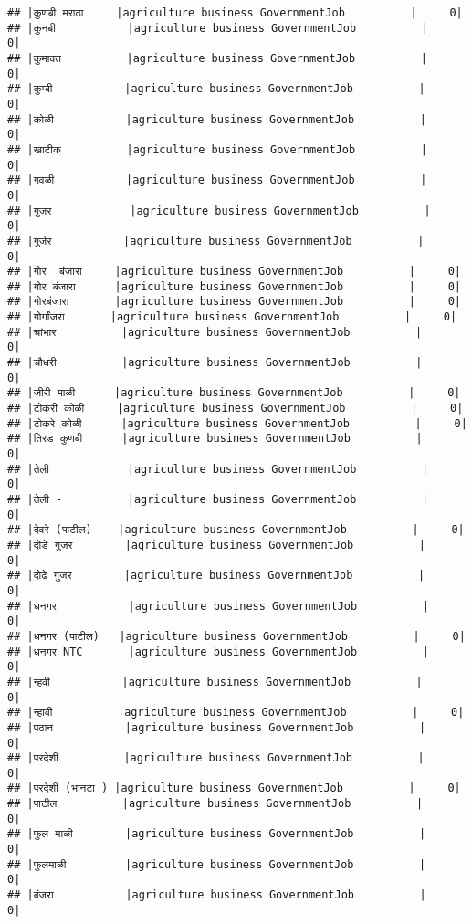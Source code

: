 \documentclass[
]{article}
\begin{document}
\begin{verbatim}
## |कुणबी मराठा     |agriculture business GovernmentJob          |     0|
## |कुनबी           |agriculture business GovernmentJob          |     0|
## |कुमावत          |agriculture business GovernmentJob          |     0|
## |कुम्बी           |agriculture business GovernmentJob          |     0|
## |कोळी           |agriculture business GovernmentJob          |     0|
## |खाटीक          |agriculture business GovernmentJob          |     0|
## |गवळी           |agriculture business GovernmentJob          |     0|
## |गुजर            |agriculture business GovernmentJob          |     0|
## |गुर्जर           |agriculture business GovernmentJob          |     0|
## |गोर  बंजारा     |agriculture business GovernmentJob          |     0|
## |गोर बंजारा      |agriculture business GovernmentJob          |     0|
## |गोरबंजारा       |agriculture business GovernmentJob          |     0|
## |गोर्गांजरा       |agriculture business GovernmentJob          |     0|
## |चांभार          |agriculture business GovernmentJob          |     0|
## |चौधरी          |agriculture business GovernmentJob          |     0|
## |जीरी माळी      |agriculture business GovernmentJob          |     0|
## |टोकरी कोळी     |agriculture business GovernmentJob          |     0|
## |टोकरे कोळी      |agriculture business GovernmentJob          |     0|
## |तिरड कुणबी      |agriculture business GovernmentJob          |     0|
## |तेली            |agriculture business GovernmentJob          |     0|
## |तेली -          |agriculture business GovernmentJob          |     0|
## |देवरे (पाटील)    |agriculture business GovernmentJob          |     0|
## |दोडे गुजर        |agriculture business GovernmentJob          |     0|
## |दोढे गुजर        |agriculture business GovernmentJob          |     0|
## |धनगर           |agriculture business GovernmentJob          |     0|
## |धनगर (पाटील)   |agriculture business GovernmentJob          |     0|
## |धनगर NTC       |agriculture business GovernmentJob          |     0|
## |न्हवी           |agriculture business GovernmentJob          |     0|
## |न्हावी          |agriculture business GovernmentJob          |     0|
## |पठान           |agriculture business GovernmentJob          |     0|
## |परदेशी          |agriculture business GovernmentJob          |     0|
## |परदेशी (भानटा ) |agriculture business GovernmentJob          |     0|
## |पाटील          |agriculture business GovernmentJob          |     0|
## |फुल माळी        |agriculture business GovernmentJob          |     0|
## |फुलमाळी         |agriculture business GovernmentJob          |     0|
## |बंजरा           |agriculture business GovernmentJob          |     0|

\end{verbatim}
\end{document}
